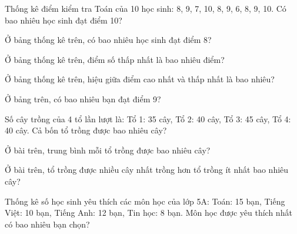 
\begin{ex}
  Thống kê điểm kiểm tra Toán của 10 học sinh: 8, 9, 7, 10, 8, 9, 6, 8, 9, 10. Có bao nhiêu học sinh đạt điểm 10?
\end{ex}

\begin{ex}
  Ở bảng thống kê trên, có bao nhiêu học sinh đạt điểm 8?
\end{ex}

\begin{ex}
  Ở bảng thống kê trên, điểm số thấp nhất là bao nhiêu điểm?
\end{ex}

\begin{ex}
  Ở bảng thống kê trên, hiệu giữa điểm cao nhất và thấp nhất là bao nhiêu?
\end{ex}

\begin{ex}
  Ở bảng trên, có bao nhiêu bạn đạt điểm 9?
\end{ex}

\begin{ex}
  Số cây trồng của 4 tổ lần lượt là: Tổ 1: 35 cây, Tổ 2: 40 cây, Tổ 3: 45 cây, Tổ 4: 40 cây. Cả bốn tổ trồng được bao nhiêu cây?
\end{ex}

\begin{ex}
  Ở bài trên, trung bình mỗi tổ trồng được bao nhiêu cây?
\end{ex}

\begin{ex}
  Ở bài trên, tổ trồng được nhiều cây nhất trồng hơn tổ trồng ít nhất bao nhiêu cây?
\end{ex}

\begin{ex}
  Thống kê số học sinh yêu thích các môn học của lớp 5A: Toán: 15 bạn, Tiếng Việt: 10 bạn, Tiếng Anh: 12 bạn, Tin học: 8 bạn. Môn học được yêu thích nhất có bao nhiêu bạn chọn?
\end{ex}

